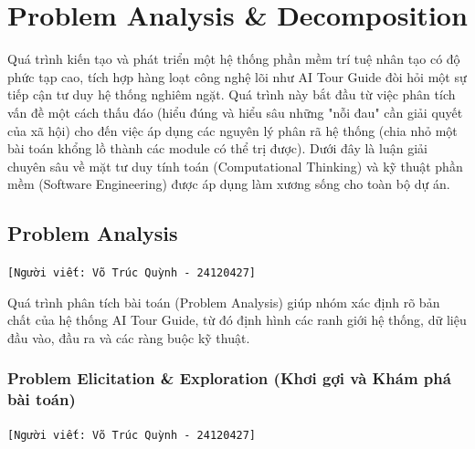 \section{Problem Analysis \& Decomposition}

Quá trình kiến tạo và phát triển một hệ thống phần mềm trí tuệ nhân tạo có độ phức tạp cao, tích hợp hàng loạt công nghệ lõi như AI Tour Guide đòi hỏi một sự tiếp cận tư duy hệ thống nghiêm ngặt. Quá trình này bắt đầu từ việc phân tích vấn đề một cách thấu đáo (hiểu đúng và hiểu sâu những "nỗi đau" cần giải quyết của xã hội) cho đến việc áp dụng các nguyên lý phân rã hệ thống (chia nhỏ một bài toán khổng lồ thành các module có thể trị được). Dưới đây là luận giải chuyên sâu về mặt tư duy tính toán (Computational Thinking) và kỹ thuật phần mềm (Software Engineering) được áp dụng làm xương sống cho toàn bộ dự án.

\subsection{Problem Analysis}
\texttt{[Người viết: Võ Trúc Quỳnh - 24120427]}

Quá trình phân tích bài toán (Problem Analysis) giúp nhóm xác định rõ bản chất của hệ thống AI Tour Guide, từ đó định hình các ranh giới hệ thống, dữ liệu đầu vào, đầu ra và các ràng buộc kỹ thuật.

\subsubsection{Problem Elicitation \& Exploration (Khơi gợi và Khám phá bài toán)}
\texttt{[Người viết: Võ Trúc Quỳnh - 24120427]}

